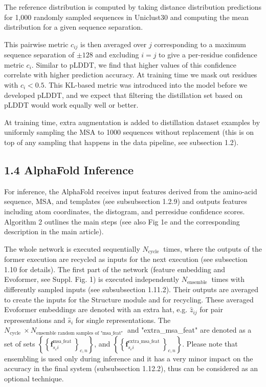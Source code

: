 \documentclass[10pt]{article}
\begin{document}
The reference distribution is computed by taking distance distribution predictions for 1,000 randomly sampled sequences in Uniclust30 and computing the mean distribution for a given sequence separation.

This pairwise metric $c_{i j}$ is then averaged over $j$ corresponding to a maximum sequence separation of $\pm 128$ and excluding $i=j$ to give a per-residue confidence metric $c_{i}$. Similar to pLDDT, we find that higher values of this confidence correlate with higher prediction accuracy. At training time we mask out residues with $c_{i}<0.5$. This KL-based metric was introduced into the model before we developed pLDDT, and we expect that filtering the distillation set based on pLDDT would work equally well or better.

At training time, extra augmentation is added to distillation dataset examples by uniformly sampling the MSA to 1000 sequences without replacement (this is on top of any sampling that happens in the data pipeline, see subsection 1.2).

\subsection*{1.4 AlphaFold Inference}
For inference, the AlphaFold receives input features derived from the amino-acid sequence, MSA, and templates (see subsubsection 1.2.9) and outputs features including atom coordinates, the distogram, and perresidue confidence scores. Algorithm 2 outlines the main steps (see also Fig 1e and the corresponding description in the main article).

The whole network is executed sequentially $N_{\text {cycle }}$ times, where the outputs of the former execution are recycled as inputs for the next execution (see subsection 1.10 for details). The first part of the network (feature embedding and Evoformer, see Suppl. Fig. 1) is executed independently $N_{\text {ensemble }}$ times with differently sampled inputs (see subsubsection 1.11.2). Their outputs are averaged to create the inputs for the Structure module and for recycling. These averaged Evoformer embeddings are denoted with an extra hat, e.g. $\hat{z}_{i j}$ for pair representations and $\hat{s}_{i}$ for single representations. The $N_{\text {cycle }} \times N_{\text {ensemble random samples of "msa_feat" }}$ and "extra\_msa\_feat" are denoted as a set of sets $\left\{\left\{\mathbf{f}_{s_{c} i}^{\text {msa_feat }}\right\}_{c, n}\right\}$, and $\left\{\left\{\mathbf{f}_{s_{e} i}^{\text {extra_msa_feat }}\right\}_{c, n}\right\}$. Please note that ensembling is used only during inference and it has a very minor impact on the accuracy in the final system (subsubsection 1.12.2), thus can be considered as an optional technique.
\end{document}
